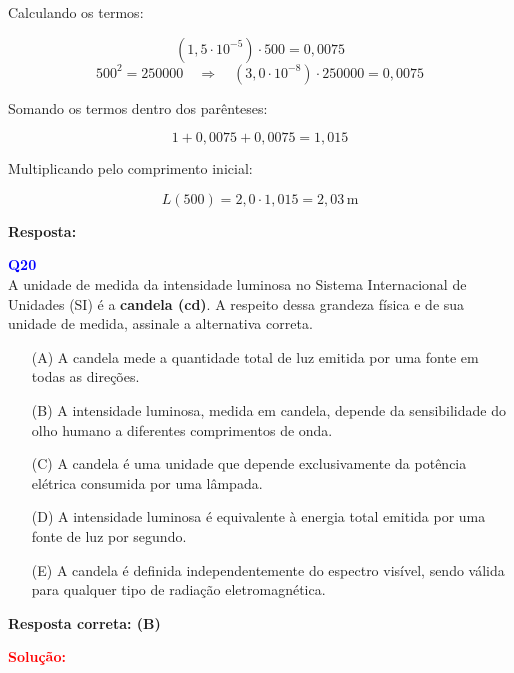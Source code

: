 \documentclass[a4paper,12pt]{article}
\begin{document}
\begin{flushleft}
Calculando os termos:

\[
(1{,}5 \cdot 10^{-5}) \cdot 500 = 0{,}0075
\]
\[
500^2 = 250000 \quad \Rightarrow \quad (3{,}0 \cdot 10^{-8}) \cdot 250000 = 0{,}0075
\]

Somando os termos dentro dos parênteses:

\[
1 + 0{,}0075 + 0{,}0075 = 1{,}015
\]

Multiplicando pelo comprimento inicial:

\[
L(500) = 2{,}0 \cdot 1{,}015 = 2{,}03\,\text{m}
\]

\textbf{Resposta:}  \quad {}

\end{flushleft}

\begin{flushleft}
\textbf{\textcolor{blue}{\Large Q20}}\\

A unidade de medida da intensidade luminosa no Sistema Internacional de Unidades (SI) é a \textbf{candela (cd)}. A respeito 
dessa grandeza física e de sua unidade de medida, assinale a alternativa correta.

\begin{enumerate}
    \item[(A)] A candela mede a quantidade total de luz emitida por uma fonte em todas as direções.
    
    \item[\colorbox{green!50}{(B)}] A intensidade luminosa, medida em candela, depende da sensibilidade do olho humano a diferentes comprimentos de onda.
    
    \item[(C)] A candela é uma unidade que depende exclusivamente da potência elétrica consumida por uma lâmpada.
    
    \item[(D)] A intensidade luminosa é equivalente à energia total emitida por uma fonte de luz por segundo.
    
    \item[(E)] A candela é definida independentemente do espectro visível, sendo válida para qualquer tipo de radiação eletromagnética.
\end{enumerate}

\textbf{Resposta correta: (B)}

\vspace{0.5cm}

\textcolor{red}{\textbf{Solução:}}\\

\end{flushleft}
\end{document}
